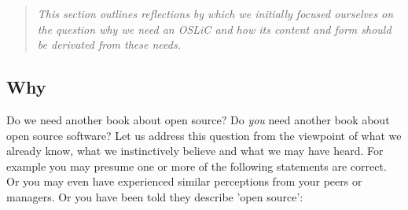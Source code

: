 %
%
%
%
%


\footnotesize \begin{quote}\itshape This section outlines reflections by which
we initially focused ourselves on the question why we need an OSLiC and how its
content and form should be derivated from these needs.
\end{quote}
\normalsize{}

\subsection{Why}

Do we need another book about open source? Do \emph{you} need another book about
open source software? Let us address this question from the viewpoint of what we
already know, what we instinctively believe and what we may have heard. For
example you may presume one or more of the following statements are correct. Or
you may even have experienced similar perceptions from your peers or managers.
Or you have been told they describe 'open source':


